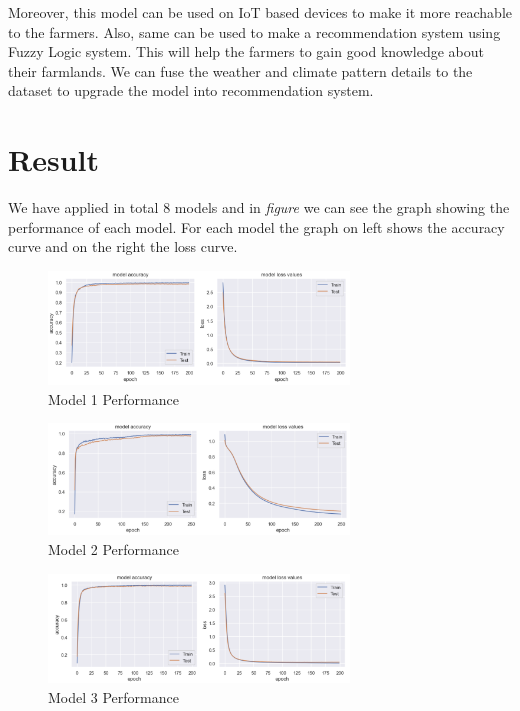 \documentclass[conference]{IEEEtran}
\begin{document}
Moreover, this model can be used on IoT based devices to make it more reachable to the farmers. Also, same can be used to make a recommendation system using Fuzzy Logic system. This will help the farmers to gain good knowledge about their farmlands. We can fuse the weather and climate pattern details to the dataset to upgrade the model into recommendation system.


\section{Result}
We have applied in total 8 models and in \emph{figure} we can see the graph showing the performance of each model. For each model the graph on left shows the accuracy curve and on the right the loss curve.

\begin{figure}[htp]
    \centering
    \includegraphics[width = 8cm] {Model1Performance.png}
    \caption{Model 1 Performance}
    \label{fig:Model1Performance}
\end{figure}

\begin{figure}[htp]
    \centering
    \includegraphics[width = 8cm]{Model2Performance.png}
    \caption{Model 2 Performance}
    \label{fig:Model2Performance}
\end{figure}

\begin{figure}[htp]
    \centering
    \includegraphics[width = 8cm]{Model3Performance.png}
    \caption{Model 3 Performance}
    \label{fig:Model3Performance}
\end{figure}
\end{document}
